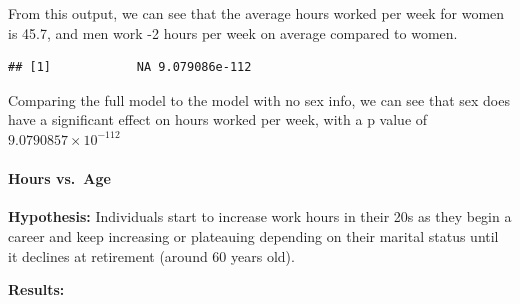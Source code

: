 \documentclass[]{article}
\newenvironment{Shaded}{\begin{snugshade}}{\end{snugshade}}
\newcommand{\KeywordTok}[1]{\textcolor[rgb]{0.13,0.29,0.53}{\textbf{#1}}}
\newcommand{\NormalTok}[1]{#1}
\newcommand{\OperatorTok}[1]{\textcolor[rgb]{0.81,0.36,0.00}{\textbf{#1}}}
\let\oldparagraph\paragraph
\renewcommand{\paragraph}[1]{\oldparagraph{#1}\mbox{}}
\begin{document}
From this output, we can see that the average hours worked per week for
women is 45.7, and men work -2 hours per week on average compared to
women.

\begin{Shaded}
\end{Shaded}

\begin{verbatim}
## [1]            NA 9.079086e-112
\end{verbatim}

Comparing the full model to the model with no sex info, we can see that
sex does have a significant effect on hours worked per week, with a p
value of \ensuremath{9.0790857\times 10^{-112}}

\hypertarget{hours-vs.-age}{%
\paragraph{Hours vs.~Age}\label{hours-vs.-age}}

\textbf{Hypothesis:} Individuals start to increase work hours in their
20s as they begin a career and keep increasing or plateauing depending
on their marital status until it declines at retirement (around 60 years
old).

\textbf{Results:}
\end{document}

